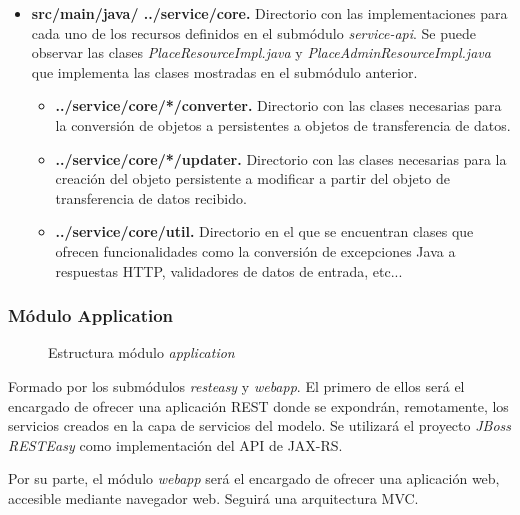 \begin{itemize}
	\item \textbf{src/main/java/ ../service/core. } Directorio con las implementaciones para cada uno de los recursos definidos en el submódulo \textit{service-api}. Se puede observar las clases \textit{PlaceResourceImpl.java} y \textit{PlaceAdminResourceImpl.java} que implementa las clases mostradas en el submódulo anterior.
	\begin{itemize}
		\item \textbf{../service/core/*/converter. } Directorio con las clases necesarias para la conversión de objetos a persistentes a objetos de transferencia de datos.
		\item \textbf{../service/core/*/updater. } Directorio con las clases necesarias para la creación del objeto persistente a modificar a partir del objeto de transferencia de datos recibido. 
		\item \textbf{../service/core/util. } Directorio en el que se encuentran clases que ofrecen funcionalidades como la conversión de excepciones Java a respuestas HTTP, validadores de datos de entrada, etc...
	\end{itemize}
\end{itemize}



\subsubsection*{Módulo Application}
\begin{figure}[H]
\centering
{}
\caption{Estructura módulo \textit{application}}
\end{figure}

Formado por los submódulos \textit{resteasy} y \textit{webapp}. El primero de ellos será el encargado de ofrecer una aplicación REST donde se expondrán, remotamente, los servicios creados en la capa de servicios del modelo. Se utilizará el proyecto \textit{JBoss RESTEasy} como implementación del API de JAX-RS.

Por su parte, el módulo \textit{webapp} será el encargado de ofrecer una aplicación web, accesible mediante navegador web. Seguirá una arquitectura MVC.


